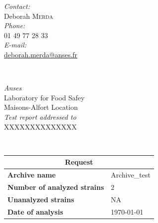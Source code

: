 \documentclass[a4paper]{article}
\begin{document}
\begin{titlepage}

\begin{minipage}{0.4\textwidth}
\begin{flushleft} \large
\emph{Contact:}\\
Deborah \textsc{Merda} \\ 
\emph{Phone:}\\
01 49 77 28 33\\
\emph{E-mail:}\\
\href{mailto:deborah.merda@anses.fr}{deborah.merda@anses.fr}
\end{flushleft}
\end{minipage}
~
\begin{minipage}{0.5\textwidth}
\begin{flushright} \large
\emph{Anses} \\
Laboratory for Food Safey \\
Maisons-Alfort Location\\
[0.5cm] \emph{Test report addressed to } \\
XXXXXXXXXXXXXX\\ %
\end{flushright}
\end{minipage}\\[3cm]

{\renewcommand{\arraystretch}{2} %
{\setlength{\tabcolsep}{1.5cm} %
\begin{tabular}{|l|l|}
  \hline
  \multicolumn{2}{|c|}{\textbf{\Large{Request}}} \\
  \hline
  \textbf{\Large{Archive name}} & \Large{Archive\_test} \\%
  \textbf{\Large{Number of analyzed strains}} & \Large{2} \\%
  \textbf{\Large{Unanalyzed strains}} & \Large{NA} \\%
  \textbf{\Large{Date of analysis}} & \Large{\today} \\
  \hline
\end{tabular}\\[4cm]
}}


\end{titlepage}
\end{document}
